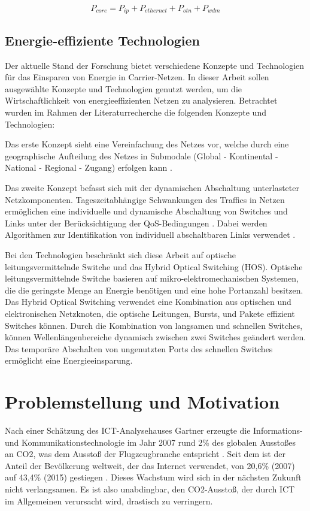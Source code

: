 \begin{equation}
P_{core} = P_{ip} + P_{ethernet} + P_{otn} + P_{wdm}
\end{equation}


\subsection{Energie-effiziente Technologien}
Der aktuelle Stand der Forschung bietet verschiedene Konzepte und Technologien für das Einsparen von Energie in Carrier-Netzen. In dieser Arbeit sollen ausgewählte Konzepte und Technologien genutzt werden, um die Wirtschaftlichkeit von energieeffizienten Netzen zu analysieren. Betrachtet wurden im Rahmen der Literaturrecherche die folgenden Konzepte und Technologien: 

Das erste Konzept sieht eine Vereinfachung des Netzes vor, welche durch eine geographische Aufteilung des Netzes in Submodale (Global - Kontinental - National - Regional - Zugang) erfolgen kann \cite{aleksic2014}.

Das zweite Konzept befasst sich mit der dynamischen Abschaltung unterlasteter Netzkomponenten. Tageszeitabhängige Schwankungen des Traffics in Netzen ermöglichen eine individuelle und dynamische Abschaltung von Switches und Links unter der Be\-rück\-sich\-ti\-gung der QoS-Bedingungen \cite{aleksic2013}. Dabei werden Algorithmen zur Identifikation von individuell abschaltbaren Links verwendet \cite{fisher}.

Bei den Technologien beschränkt sich diese Arbeit auf optische leitungsvermittelnde Switche und das Hybrid Optical Switching (HOS). Optische leitungsvermittelnde Switche basieren auf mikro-elektromechanischen Systemen, die die geringste Menge an Energie benötigen und eine hohe Portanzahl besitzen. Das Hybrid Optical Switching verwendet eine Kombination aus optischen und elektronischen Netzknoten, die optische Leitungen, Bursts, und Pakete effizient Switches können. Durch die Kombination von langsamen und schnellen Switches, können Wellenlängenbereiche dynamisch zwischen zwei Switches geändert werden. Das temporäre Abschalten von ungenutzten Ports des schnellen Switches ermöglicht eine Energieeinsparung.  \cite{aleksic2013}

\section{Problemstellung und Motivation}
Nach einer Schätzung des ICT-Analysehauses Gartner erzeugte die Informations- und Kommunikationstechnologie im Jahr 2007 rund 2\% des globalen Ausstoßes an CO2, was dem Ausstoß der Flugzeugbranche entspricht \cite{gartner}. Seit dem ist der Anteil der Bevölkerung weltweit, der das Internet verwendet, von 20,6\% (2007) auf 43,4\% (2015) gestiegen \cite{itu}. Dieses Wachstum wird sich in der nächsten Zukunft nicht verlangsamen. Es ist also unabdingbar, den CO2-Ausstoß, der durch ICT im Allgemeinen verursacht wird, drastisch zu verringern.

